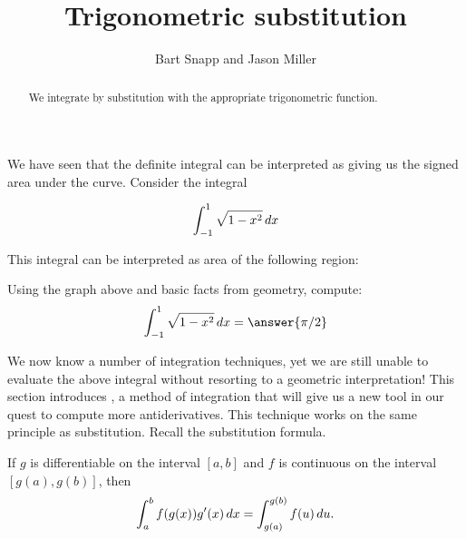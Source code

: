\documentclass{ximera}
\author{Bart Snapp and Jason Miller}
\title[Dig-In:]{Trigonometric substitution}
\begin{document}
\begin{abstract}
  We integrate by substitution with the appropriate trigonometric
  function.
\end{abstract}
\maketitle

We have seen that the definite integral can be interpreted as giving us the signed area under the curve. Consider the integral 

\[
\int_{-1}^1 \sqrt{1-x^2} \mathop{}\!d x
\]

 This integral can be interpreted as area of the following region:
\begin{image}
\end{image}

\begin{question}
  Using the graph above and basic facts from geometry, compute:
  \[
  \int_{-1}^1 \sqrt{1-x^2} \d x = \answer{\pi/2}
  \]
\end{question}

We now know a number of integration techniques, yet we are still
unable to evaluate the above integral without resorting to a geometric
interpretation!  This section introduces ,
a method of integration that will give us a new tool in our quest to compute more antiderivatives.
This technique works on the same principle as substitution. Recall the
substitution formula.

\begin{theorem} 
If $g$ is differentiable on the interval $[a,b]$ and $f$ is
continuous on the interval $[g(a),g(b)]$, then
\[
\int_a^b f(g(x)) g'(x) \mathop{}\!d x =\int_{g(a)}^{g(b)} f(u) \mathop{}\!d u.
\]
\end{theorem}
\end{document}

